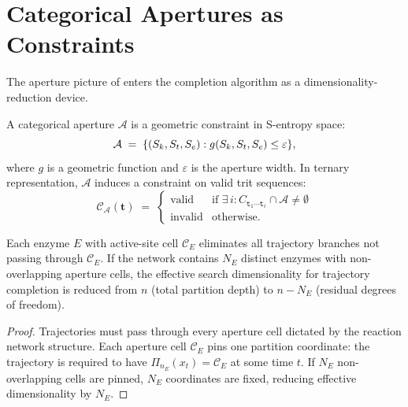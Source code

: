 \section{Categorical Apertures as Constraints}
\label{sec:aperture-constraints}

The aperture picture of  enters the completion
algorithm as a dimensionality-reduction device.

\begin{definition}
\label{def:cat-aperture}
A categorical aperture $\mathcal{A}$ is a geometric constraint in S-entropy
space:
\[
    \mathcal{A} \;=\; \{(S_k, S_t, S_e) : g(S_k, S_t, S_e) \le \varepsilon\},
\]
where $g$ is a geometric function and $\varepsilon$ is the aperture width.
In ternary representation, $\mathcal{A}$ induces a constraint on valid trit
sequences:
\[
    \mathcal{C}_\mathcal{A}(\mathbf{t})
    \;=\;
    \begin{cases}
        \text{valid}   & \text{if } \exists\,i: C_{\mathtt{t}_1\cdots\mathtt{t}_i}
                                     \cap \mathcal{A} \ne \emptyset \\
        \text{invalid} & \text{otherwise.}
    \end{cases}
\]
\end{definition}

\begin{theorem}
\label{thm:aperture-dim}
Each enzyme $E$ with active-site cell $\mathcal{C}_E$ eliminates all trajectory
branches not passing through $\mathcal{C}_E$.  If the network contains $N_E$
distinct enzymes with non-overlapping aperture cells, the effective search
dimensionality for trajectory completion is reduced from $n$ (total partition
depth) to $n - N_E$ (residual degrees of freedom).
\end{theorem}

\begin{proof}
Trajectories must pass through every aperture cell dictated by the reaction
network structure.  Each aperture cell $\mathcal{C}_E$ pins one partition
coordinate: the trajectory is required to have $\Pi_{n_E}(x_t) = \mathcal{C}_E$
at some time $t$.  If $N_E$ non-overlapping cells are pinned, $N_E$ coordinates
are fixed, reducing effective dimensionality by $N_E$.
\end{proof}

